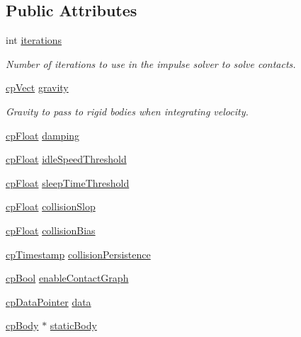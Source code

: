 \subsection*{Public Attributes}
\begin{DoxyCompactItemize}
\item 
\hypertarget{structcp_space_af278fb3ab6ec903acd2fe49ee821fcf8}{int \hyperlink{structcp_space_af278fb3ab6ec903acd2fe49ee821fcf8}{iterations}}\label{structcp_space_af278fb3ab6ec903acd2fe49ee821fcf8}

\begin{DoxyCompactList}\small\item\em Number of iterations to use in the impulse solver to solve contacts. \end{DoxyCompactList}\item 
\hypertarget{structcp_space_a93479d52c441a2e3b36716d9a9d55852}{\hyperlink{structcp_vect}{cp\-Vect} \hyperlink{structcp_space_a93479d52c441a2e3b36716d9a9d55852}{gravity}}\label{structcp_space_a93479d52c441a2e3b36716d9a9d55852}

\begin{DoxyCompactList}\small\item\em Gravity to pass to rigid bodies when integrating velocity. \end{DoxyCompactList}\item 
\hyperlink{group__basic_types_gac1ed65573e035bf892505768c852d8d3}{cp\-Float} \hyperlink{structcp_space_a421f86b111318e2eced602c6930fffaa}{damping}
\item 
\hyperlink{group__basic_types_gac1ed65573e035bf892505768c852d8d3}{cp\-Float} \hyperlink{structcp_space_a88ffce371610f2b94997160de703f1cd}{idle\-Speed\-Threshold}
\item 
\hyperlink{group__basic_types_gac1ed65573e035bf892505768c852d8d3}{cp\-Float} \hyperlink{structcp_space_a928d74741904aae266a9efff5b5f68f7}{sleep\-Time\-Threshold}
\item 
\hyperlink{group__basic_types_gac1ed65573e035bf892505768c852d8d3}{cp\-Float} \hyperlink{structcp_space_af1bec644a24e12bfc642a942a88520f7}{collision\-Slop}
\item 
\hyperlink{group__basic_types_gac1ed65573e035bf892505768c852d8d3}{cp\-Float} \hyperlink{structcp_space_a8f5a7d2a5cf25b1f18d05e9b31a87ad9}{collision\-Bias}
\item 
\hyperlink{group__basic_types_gaa24652c104082d0725066ea5ac7dc83f}{cp\-Timestamp} \hyperlink{structcp_space_a3bd0012d98c276bd903b1635b9756396}{collision\-Persistence}
\item 
\hyperlink{group__basic_types_gab6e5d8afee598a57cd323abae5310244}{cp\-Bool} \hyperlink{structcp_space_ac4f67b1946aad96a50299ac769d781bb}{enable\-Contact\-Graph}
\item 
\hyperlink{group__basic_types_ga2ac2c3c31e21893941f9e4f8ee279447}{cp\-Data\-Pointer} \hyperlink{structcp_space_a9c4c3792e422dd353a49b8657f102f33}{data}
\item 
\hyperlink{structcp_body}{cp\-Body} $\ast$ \hyperlink{structcp_space_aa7cb4add8933036493bf7f4ee98ad13e}{static\-Body}
\end{DoxyCompactItemize}


